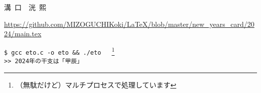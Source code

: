 \documentclass[twocolumn,fontsize=9pt]{jlreq}
\begin{document}
\begin{framed}
    {\scriptsize\noindent}
    \vspace{.5cm}
    \begin{center}
        {\LARGE 溝\ 口\ \  洸\ 熙}
    \end{center}
\end{framed}
\noindent\tiny{\url{https://github.com/MIZOGUCHIKoki/LaTeX/blob/master/new_years_card/2024/main.tex}}
\newpage

\small{\texttt{\$ gcc eto.c -o eto \&\& ./eto }\ \ \footnote{（無駄だけど）マルチプロセスで処理しています}\\
    \texttt{>> 2024年の干支は「甲辰」}}
\end{document}
